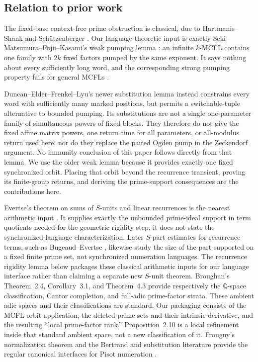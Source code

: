\subsection{Relation to prior work}\label{subsec:prior-work}

The fixed-base context-free prime obstruction is classical, due to
Hartmanis--Shank and Sch\"utzenberger
\cite{HartmanisShank1968,Schutzenberger1968}. Our language-theoretic input
is exactly Seki--Matsumura--Fujii--Kasami's weak pumping lemma
\cite[Lemma~3.2]{SekiEtAl1991}: an infinite \(k\)-MCFL contains one family
with \(2k\) fixed factors pumped by the same exponent. It says nothing
about every sufficiently long word, and the corresponding strong pumping
property fails for general MCFLs
\cite{KanazawaKobeleMichaelisSalvatiYoshinaka2014}.

Duncan--Elder--Frenkel--Lyu's newer substitution lemma
\cite[Theorem~4.5]{DuncanElderFrenkelLiu2026} instead constrains every word
with sufficiently many marked positions, but permits a switchable-tuple
alternative to bounded pumping. Its substitutions are not a single
one-parameter family of simultaneous powers of fixed blocks. They therefore
do not give the fixed affine matrix powers, one return time for all
parameters, or all-modulus return used here; nor do they replace the paired
Ogden pump in the Zeckendorf argument. No immunity conclusion of this paper
follows directly from that lemma. We use the older weak lemma because it
provides exactly one fixed synchronized orbit. Placing that orbit beyond the
recurrence transient, proving its finite-group returns, and deriving the
prime-support consequences are the contributions here.

Evertse's theorem on sums of \(S\)-units and linear recurrences is the
nearest arithmetic input \cite{Evertse1984}. It supplies exactly the
unbounded prime-ideal support in term quotients needed for the geometric
rigidity step; it does not state the synchronized-language characterization.
Later \(S\)-part estimates for recurrence terms, such as
Bugeaud--Evertse \cite{BugeaudEvertse2017}, likewise study the size of the
part supported on a fixed finite prime set, not synchronized numeration
languages. The recurrence rigidity lemma below packages these classical
arithmetic inputs for our language interface rather than claiming a separate
new \(S\)-unit theorem. Broughan's Theorem~2.4, Corollary~3.1, and
Theorem~4.3 \cite{Broughan2003} provide respectively the
\(\mathbb Q\)-space classification, Cantor completion, and full-adic
prime-factor strata. These ambient adic spaces and their classifications
are standard. Our packaging consists of the MCFL-orbit application, the
deleted-prime sets and their intrinsic derivative, and the resulting
``local prime-factor rank.'' Proposition~2.10 is a local refinement inside
that standard ambient space, not a new classification of it.
Frougny's
normalization theorem and the Bertrand and substitution literature provide
the regular canonical interfaces for Pisot numeration
\cite{Frougny1992,BruyereHansel1997,Fabre1995,FrougnySolomyak1992}.

